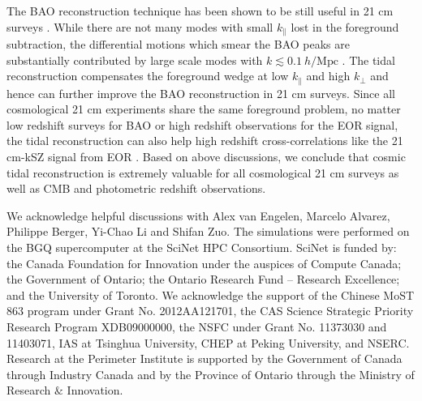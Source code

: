 \documentclass[aps,prl,twocolumn,showpacs,superscriptaddress,groupedaddress,nofootinbib,floatfix]{revtex4}  %
\newcommand{\mr}{\mathrm}
\begin{document}
The BAO reconstruction technique \cite{2007:bao} has been shown to be still
useful in 21 cm surveys \cite{2015:bao1,2015:bao2}. While there are not 
many modes with small $k_\parallel$ lost in the foreground subtraction, the 
differential motions which smear the BAO peaks are substantially contributed
by large scale modes with $k\lesssim0.1\ h/\mr{Mpc}$ \cite{2007:bao}.
The tidal reconstruction compensates the foreground wedge at low $k_\parallel$
and high $k_\perp$ and hence can further improve the BAO reconstruction in 21 cm
surveys. Since all cosmological 21 cm experiments share the same foreground
problem, no matter low redshift surveys for BAO or high redshift observations
for the EOR signal, the tidal reconstruction can also help high redshift 
cross-correlations like the 21 cm-kSZ signal from EOR \cite{2015:marcelo}. Based
on above discussions, we conclude that cosmic tidal reconstruction is extremely
valuable for all cosmological 21 cm surveys as well as CMB and photometric
redshift observations.

We acknowledge helpful discussions with Alex van Engelen, Marcelo Alvarez,
Philippe Berger, Yi-Chao Li and Shifan Zuo.
The simulations were performed on the BGQ supercomputer 
at the SciNet HPC Consortium.
SciNet is funded by: the Canada Foundation for Innovation under the auspices 
of Compute Canada;
the Government of Ontario; the Ontario Research Fund -- Research Excellence;
and the University of Toronto.
We acknowledge the support of the Chinese MoST 863 program under Grant 
No. 2012AA121701, the CAS Science Strategic Priority Research Program 
XDB09000000, the NSFC under Grant No. 11373030 and 11403071, IAS at 
Tsinghua University, CHEP at Peking University, and NSERC.
Research at the Perimeter Institute is supported by the Government of Canada 
through Industry Canada and by the Province of Ontario through the Ministry of 
Research $\&$ Innovation.



\end{document}
